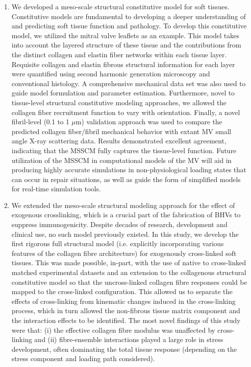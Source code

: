     \begin{enumerate}
        \item We developed a meso-scale structural constitutive model for soft tissues. Constitutive models are fundamental to developing a deeper understanding of and predicting soft tissue function and pathology. To develop this constitutive model, we utilized the mitral valve leaflets as an example. This model takes into account the layered structure of these tissue and the contributions from the distinct collagen and elastin fiber networks within each tissue layer. Requisite collagen and elastin fibrous structural information for each layer were quantified using second harmonic generation microscopy and conventional histology. A comprehensive mechanical data set was also used to guide model formulation and parameter estimation. Furthermore, novel to tissue-level structural constitutive modeling approaches, we allowed the collagen fiber recruitment function to vary with orientation. Finally, a novel fibril-level (0.1 to 1 $\mu$m) validation approach was used to compare the predicted collagen fiber/fibril mechanical behavior with extant MV small angle X-ray scattering data. Results demonstrated excellent agreement, indicating that the MSSCM fully captures the tissue-level function. Future utilization of the MSSCM in computational models of the MV will aid in producing highly accurate simulations in non-physiological loading states that can occur in repair situations, as well as guide the form of simplified models for real-time simulation tools.
        \item We extended the meso-scale structural modeling approach for the effect of exogenous crosslinking, which is a crucial part of the fabrication of BHVs to suppress immunogenicity. Despite decades of research, development and clinical use, no such model previously existed. In this study, we develop the first rigorous full structural model (i.e. explicitly incorporating various features of the collagen fibre architecture) for exogenously cross-linked soft tissues. This was made possible, in-part, with the use of native to cross-linked matched experimental datasets and an extension to the collagenous structural constitutive model so that the uncross-linked collagen fibre responses could be mapped to the cross-linked configuration. This allowed us to separate the effects of cross-linking from kinematic changes induced in the cross-linking process, which in turn allowed the non-fibrous tissue matrix component and the interaction effects to be identified.  The most novel findings of this study were that: (i) the effective collagen fibre modulus was unaffected by cross-linking and (ii) fibre-ensemble interactions played a large role in stress development, often dominating the total tissue response (depending on the stress component and loading path considered).

\end{enumerate}
